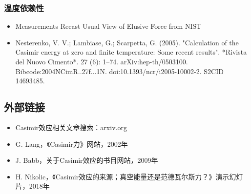 \subsubsection{温度依赖性}
\begin{itemize}
\item Measurements Recast Usual View of Elusive Force from NIST 
\item Nesterenko, V. V.; Lambiase, G.; Scarpetta, G. (2005). "Calculation of the Casimir energy at zero and finite temperature: Some recent results". *Rivista del Nuovo Cimento*. 27 (6): 1–74. arXiv:hep-th/0503100. Bibcode:2004NCimR..27f...1N. doi:10.1393/ncr/i2005-10002-2. S2CID 14693485.
\end{itemize}
\subsection{外部链接}
\begin{itemize}
\item Casimir效应相关文章搜索：arxiv.org
\item G. Lang，《Casimir力》网站，2002年
\item J. Babb，关于Casimir效应的书目网站，2009年
\item H. Nikolic，《Casimir效应的来源；真空能量还是范德瓦尔斯力？》演示幻灯片，2018年
\end{itemize}
